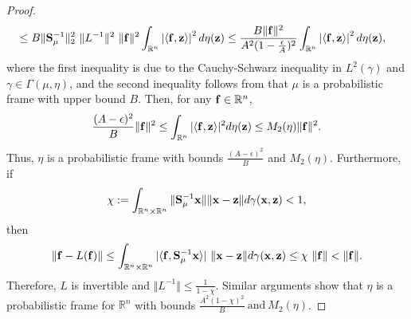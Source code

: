 \documentclass{amsart}
\numberwithin{equation}{section}
\theoremstyle{plain}
\theoremstyle{definition}
\begin{document}
\begin{proof}
\begin{equation*}
\begin{split}
 &\leq B \Vert  {\bf S}_\mu^{-1} \Vert_2^2  \ \Vert L^{-1} \Vert^2  \ \Vert {\bf f} \Vert^2   \int_{\mathbb{R}^n} \left|\langle {\bf f}, {\bf z} \rangle \right|^2 d\eta({\bf z}) \leq \frac{B\Vert {\bf f} \Vert^2}{A^2 (1-\frac{\epsilon}{A})^2 }  \int_{\mathbb{R}^n} \left| \langle {\bf f}, {\bf z} \rangle \right |^2 d\eta({\bf z}),
\end{split}
\end{equation*}
where the first inequality is due to the Cauchy-Schwarz inequality in $L^2(\gamma)$ and $\gamma \in \Gamma(\mu, \eta)$, and the second inequality follows from that $\mu$ is a probabilistic frame with upper bound $B$. 
Then, for any ${\bf f} \in \mathbb{R}^n$, 
$$ \frac{(A- \epsilon)^2}{B}    \Vert  {\bf f} \Vert^2  \leq   \int_{\mathbb{R}^n} |\langle {\bf f}, {\bf z} \rangle|^2 d\eta({\bf z}) \leq M_2(\eta) \Vert  {\bf f} \Vert^2.$$
Thus, $\eta$ is a probabilistic frame with bounds $\frac{(A- \epsilon)^2}{B}$ and $M_2(\eta)  $.
Furthermore, if 
\begin{equation*}
   \chi := \int_{\mathbb{R}^n \times \mathbb{R}^n}  \Vert {\bf S}_\mu^{-1} {\bf x}\Vert \Vert {\bf x}-{\bf z} \Vert  d \gamma({\bf x},{\bf z})<1,
\end{equation*}
then 
 \begin{equation*}
    \Vert {\bf f} -L({\bf f}) \Vert \leq  \int_{\mathbb{R}^n \times \mathbb{R}^n} |\langle {\bf f}, {\bf S}_\mu^{-1} {\bf x} \rangle| \ \|{\bf x}-{\bf z}\|  d \gamma({\bf x}, {\bf z}) \leq \chi \ \Vert  {\bf f} \Vert < \Vert  {\bf f} \Vert. 
\end{equation*}
Therefore, $L$ is invertible and $\Vert L^{-1} \Vert \leq \frac{1}{1-\chi}$.
Similar arguments show that $\eta$ is a probabilistic frame for $\mathbb{R}^n$ with bounds $\frac{A^2 (1-\chi)^2}{B} \ \text{and} \ M_2(\eta)$.
 \end{proof}
 
\end{document}
